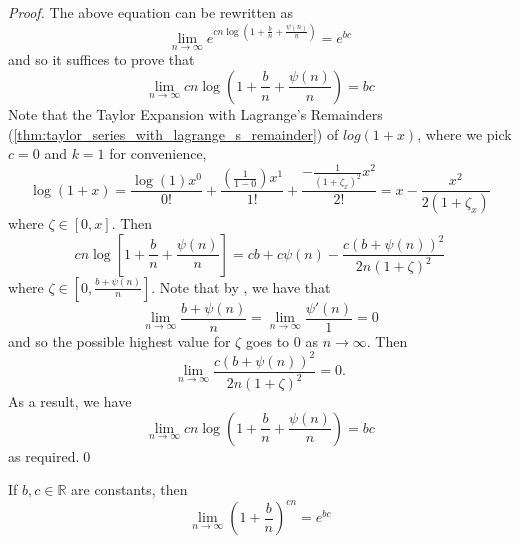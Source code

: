 \documentclass[notoc,notitlepage]{tufte-book}
\begin{document}
\begin{proof}
  The above equation can be rewritten as
  \begin{equation*}
    \lim_{n \to \infty} e^{cn \log \left( 1 + \frac{b}{n} + \frac{\psi(n)}{n} \right)} = e^{bc}
  \end{equation*}
  and so it suffices to prove that
  \begin{equation*}
    \lim_{n \to \infty} cn \log\left( 1 + \frac{b}{n} + \frac{\psi(n)}{n} \right) = bc
  \end{equation*}
  Note that the Taylor Expansion with Lagrange's Remainders (\cref{thm:taylor_series_with_lagrange_s_remainder}) of $log(1 + x)$, where we pick $c = 0$ and $k = 1$ for convenience,
  \begin{equation*}
    \log(1 + x) = \frac{\log(1) x^0}{0!} + \frac{\left( \frac{1}{1 - 0} \right) x^1}{1!} + \frac{- \frac{1}{(1 + \zeta_x)^2} x^2}{2!} = x - \frac{x^2}{2 ( 1 + \zeta_x )}
  \end{equation*}
  where $\zeta \in [0, x]$. Then
  \begin{equation*}
    cn \log \left[ 1 + \frac{b}{n} + \frac{\psi(n)}{n} \right] = cb + c \psi(n) - \frac{c (b + \psi(n))^2}{2n(1 + \zeta)^2}
  \end{equation*}
  where $\zeta \in \left[0, \frac{b + \psi(n)}{n}\right]$. Note that by , we have that
  \begin{equation*}
    \lim_{n \to \infty} \frac{b + \psi(n)}{n} = \lim_{n \to \infty} \frac{\psi'(n)}{1} = 0
  \end{equation*}
  and so the possible highest value for $\zeta$ goes to $0$ as $n \to \infty$. Then
  \begin{equation*}
    \lim_{n \to \infty} \frac{c( b + \psi(n) )^2}{2n ( 1 + \zeta )^2} = 0.
  \end{equation*}
  As a result, we have
  \begin{equation*}
    \lim_{n \to \infty} cn \log\left( 1 + \frac{b}{n} + \frac{\psi(n)}{n} \right) = bc
  \end{equation*}
  as required.\qed
\end{proof}

\begin{crly}
\label{crly:limit_definition_of_e_}
  If $b, c \in \mathbb{R}$ are constants, then
  \begin{equation*}
    \lim_{n \to \infty} \left( 1 + \frac{b}{n} \right)^{cn} = e^{bc}
  \end{equation*}
\end{crly}
\end{document}
